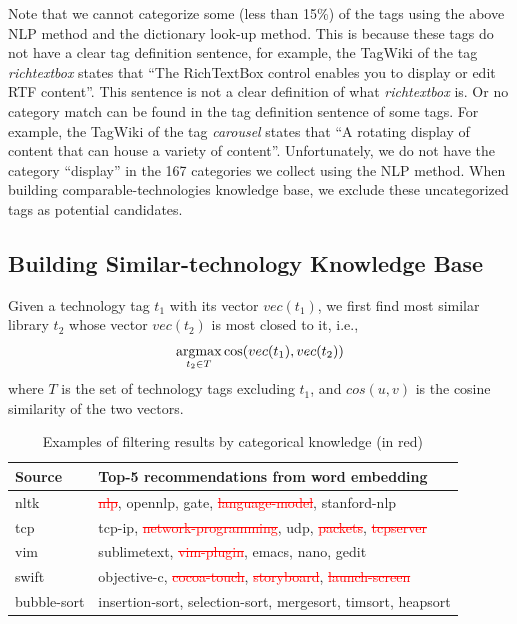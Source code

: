 Note that we cannot categorize some (less than 15\%) of the tags using the above NLP method and the dictionary look-up method.
This is because these tags do not have a clear tag definition sentence, for example, the TagWiki of the tag \textit{richtextbox} states that ``The RichTextBox control enables you to display or edit RTF content''.
This sentence is not a clear definition of what \textit{richtextbox} is.
Or no category match can be found in the tag definition sentence of some tags.
For example, the TagWiki of the tag \textit{carousel} states that ``A rotating display of content that can house a variety of content''.
Unfortunately, we do not have the category ``display'' in the 167 categories we collect using the NLP method.
When building comparable-technologies knowledge base, we exclude these uncategorized tags as potential candidates.

\subsection{Building Similar-technology Knowledge Base}
Given a technology tag $t_1$ with its vector $vec(t_1)$, we first find most similar library $t_2$ whose vector $vec(t_2)$ is most closed to it, i.e.,
\begin{equation}
	\operatornamewithlimits{argmax}_{t_2 \in T}  \cos (vec(t_1), vec(t_2)) 
	\label{equ:similarity}
\end{equation} 
where $T$ is the set of technology tags excluding $t_1$, and $cos(u, v)$ is the cosine similarity of the two vectors.

\begin{table}
	\small
	\center	
	\caption{Examples of filtering results by categorical knowledge (in red)}
	\vspace{-2mm}
	\setlength{\tabcolsep}{0.2em}
	\begin{tabular}{l|l}
		\hline
		\textbf{Source} & \textbf{Top-5 recommendations from word embedding} \\
		\hline
		nltk   & \textcolor{red}{\st{nlp}}, opennlp, gate, \textcolor{red}{\st{language-model}}, stanford-nlp \\
		tcp    & tcp-ip, \textcolor{red}{\st{network-programming}}, udp, \textcolor{red}{\st{packets}}, \textcolor{red}{\st{tcpserver}} \\
		vim    & sublimetext, \textcolor{red}{\st{vim-plugin}}, emacs, nano, gedit\\
		swift  & objective-c, \textcolor{red}{\st{cocoa-touch}}, \textcolor{red}{\st{storyboard}}, \textcolor{red}{\st{launch-screen}} \\%
		bubble-sort & insertion-sort, selection-sort, mergesort, timsort, heapsort \\
				\hline
	\end{tabular}
	\vspace{-3mm}
	\label{tab:filterResult}
\end{table}

